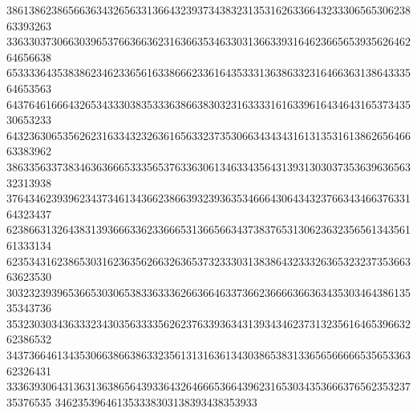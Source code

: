 38613862386566363432656331366432393734383231353162633664323330656530623863393263
33633037306630396537663663623163663534633031366339316462366565393562646264656638
65333364353838623462336561633866623361643533313638633231646636313864333564653563
64376461666432653433303835333638663830323163333161633961643464316537343530653233
64323630653562623163343232636165633237353066343434316131353161386265646663383962
38633563373834636366653335653763363061346334356431393130303735363963656332313938
37643462393962343734613436623866393239363534666430643432376634346637633164323437
62386631326438313936663362336665313665663437383765313062363235656134356161333134
62353431623865303162363562663263653732333031383864323332636532323735366363623530
30323239396536653030653833633362663664633736623666636636343530346438613535343736
35323030343633323430356333356262376339363431393434623731323561646539663262386532
34373664613435306638663863323561313163613430386538313365656666653565336362326431
33363930643136313638656439336432646665366439623165303435366637656235323735376535
346235396461353338303138393438353933
